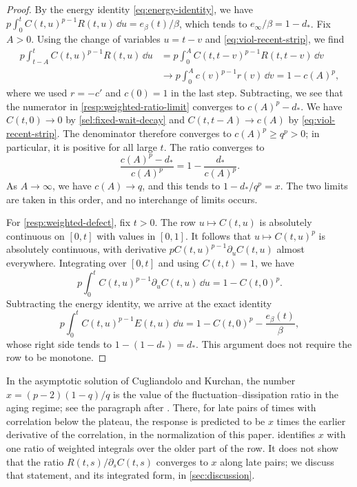 \begin{proof}
By the energy identity \eqref{eq:energy-identity}, we have $p\int_0^tC(t,u)^{p-1}R(t,u)\,\dd u=e_\beta(t)/\beta$, which tends to $e_\infty/\beta=1-d_*$. Fix $A>0$. Using the change of variables $u=t-v$ and \eqref{eq:viol-recent-strip}, we find
\[
\begin{aligned}
 p\int_{t-A}^tC(t,u)^{p-1}R(t,u)\,\dd u&=p\int_0^AC(t,t-v)^{p-1}R(t,t-v)\,\dd v\\
 &\longrightarrow p\int_0^Ac(v)^{p-1}r(v)\,\dd v=1-c(A)^p,
\end{aligned}
\]
where we used $r=-c'$ and $c(0)=1$ in the last step. Subtracting, we see that the numerator in \eqref{resp:weighted-ratio-limit} converges to $c(A)^p-d_*$. We have $C(t,0)\to0$ by \eqref{sel:fixed-wait-decay} and $C(t,t-A)\to c(A)$ by \eqref{eq:viol-recent-strip}. The denominator therefore converges to $c(A)^p\ge q^p>0$; in particular, it is positive for all large $t$. The ratio converges to
\[
 \frac{c(A)^p-d_*}{c(A)^p}=1-\frac{d_*}{c(A)^p}.
\]
As $A\to\infty$, we have $c(A)\to q$, and this tends to $1-d_*/q^p=x$. The two limits are taken in this order, and no interchange of limits occurs.

For \eqref{resp:weighted-defect}, fix $t>0$. The row $u\mapsto C(t,u)$ is absolutely continuous on $[0,t]$ with values in $[0,1]$. It follows that $u\mapsto C(t,u)^p$ is absolutely continuous, with derivative $pC(t,u)^{p-1}\partial_uC(t,u)$ almost everywhere. Integrating over $[0,t]$ and using $C(t,t)=1$, we have
\[
 p\int_0^tC(t,u)^{p-1}\partial_uC(t,u)\,\dd u=1-C(t,0)^p.
\]
Subtracting the energy identity, we arrive at the exact identity
\[
 p\int_0^tC(t,u)^{p-1}E(t,u)\,\dd u=1-C(t,0)^p-\frac{e_\beta(t)}\beta,
\]
whose right side tends to $1-(1-d_*)=d_*$. This argument does not require the row to be monotone.
\end{proof}

\begin{remark}[Interpretation of $x$]\label{rem:viol-x-interpretation}
In the asymptotic solution of Cugliandolo and Kurchan, the number $x=(p-2)(1-q)/q$ is the value of the fluctuation--dissipation ratio in the aging regime; see the paragraph after \cite[arXiv version~1, Equation~(12), p.~6]{ck1993}. There, for late pairs of times with correlation below the plateau, the response is predicted to be $x$ times the earlier derivative of the correlation, in the normalization of this paper.  identifies $x$ with one ratio of weighted integrals over the older part of the row. It does not show that the ratio $R(t,s)/\partial_sC(t,s)$ converges to $x$ along late pairs; we discuss that statement, and its integrated form, in \cref{sec:discussion}.
\end{remark}

